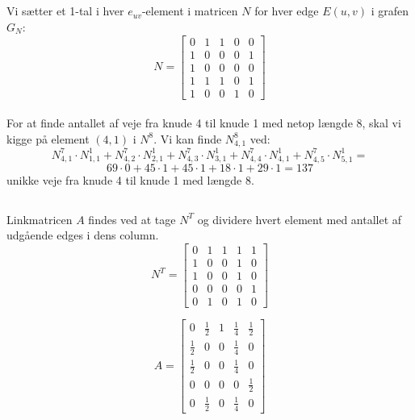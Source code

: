 \documentclass[a4paper,12pt]{article}
\begin{document}
\subsection{}
Vi sætter et 1-tal i hver $e_{uv}$-element i matricen $N$ for hver edge $E(u,v)$ i grafen $G_N$:\\

\[
N = 
\left[\begin{array}{ccccc}
    0 & 1 & 1 & 0 & 0 \\
    1 & 0 & 0 & 0 & 1 \\
    1 & 0 & 0 & 0 & 0 \\
    1 & 1 & 1 & 0 & 1 \\
    1 & 0 & 0 & 1 & 0 
\end{array}\right]
\]\\

For at finde antallet af veje fra knude 4 til knude 1 med netop længde 8, skal vi kigge på element $(4,1)$ i $N^8$. Vi kan finde $N^8_{4,1}$ ved:\\
\[
N^7_{4,1} \cdot N^1_{1,1} + N^7_{4,2} \cdot N^1_{2,1} + N^7_{4,3} \cdot N^1_{3,1} + N^7_{4,4} \cdot N^1_{4,1} + N^7_{4,5} \cdot N^1_{5,1} =
\]
\[
69 \cdot 0 + 45 \cdot 1 + 45 \cdot 1 + 18 \cdot 1 + 29 \cdot 1 = 137
\]
unikke veje fra knude 4 til knude 1 med længde 8.\\

\subsection{}
Linkmatricen $A$ findes ved at tage $N^T$ og dividere hvert element med antallet af udgående edges i dens column.\\
\[
N^T =
\left[\begin{array}{ccccc}
    0 & 1 & 1 & 1 & 1 \\
    1 & 0 & 0 & 1 & 0 \\
    1 & 0 & 0 & 1 & 0 \\
    0 & 0 & 0 & 0 & 1 \\
    0 & 1 & 0 & 1 & 0
\end{array}\right]
\]


\[
A =
\left[\begin{array}{ccccc}
    0 & \frac{1}{2} & 1 & \frac{1}{4} & \frac{1}{2} \\
    \frac{1}{2} & 0 & 0 & \frac{1}{4} & 0 \\
    \frac{1}{2} & 0 & 0 & \frac{1}{4} & 0 \\
    0 & 0 & 0 & 0 & \frac{1}{2} \\
    0 & \frac{1}{2} & 0 & \frac{1}{4} & 0
\end{array}\right]
\]
\end{document}
